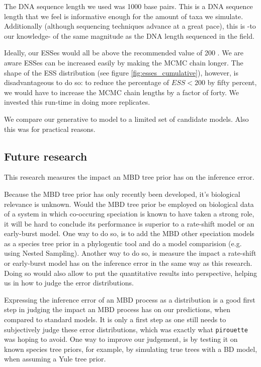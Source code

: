 The DNA sequence length we used was 1000 base pairs. This is a DNA
sequence length that we  feel is informative enough
for the amount of taxa we simulate. Additionally (although sequencing
techniques advance at a great pace), this is -to our knowledge- 
of the same magnitude as the DNA length sequenced in the field.

Ideally, our ESSes would all be above the recommended value of 
200 . We are aware ESSes can be increased easily by
making the MCMC chain longer. The shape of the ESS distribution
(see figure \ref{fig:esses_cumulative}), however, is disadvantageous
to do so: to reduce the percentage of $ESS < 200$ by fifty percent,
we would have to increase the MCMC chain lengths by a factor of forty.
We invested this run-time in doing more replicates.

We compare our generative to model to  
a limited set of candidate models. Also this was for practical
reasons.

\subsection{Future research}

This research measures the impact an MBD tree prior 
has on the inference error. 

Because the MBD tree prior has only recently been 
developed, it's biological relevance is unknown.
Would the MBD tree prior be employed on biological data of a system
in which co-occuring speciation is known to have taken a strong role,
it will be hard to conclude its performance is superior to a
rate-shift model or an early-burst model. One way to do so, is
to add the MBD other speciation models as a species tree prior
in a phylogentic tool and do a model comparision (e.g. using Nested Sampling).
Another way to do so, is measure the impact a rate-shift or early-burst model
has on the inference error in the same way as this research.
Doing so would also allow to put the quantitative results into perspective,
helping us in how to judge the error distributions. 

Expressing the inference error of an MBD process as a distribution
is a good first step in judging the impact an MBD process has on
our predictions, when compared to standard models. It is only a first
step as one still needs to subjectively judge these error distributions,
which was exactly what \verb;pirouette; was hoping to avoid. 
One way to improve our judgement, is by testing it on known species tree
priors, for example, by simulating true trees with a BD model, when assuming
a Yule tree prior.  

